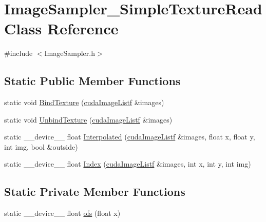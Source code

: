\hypertarget{class_image_sampler___simple_texture_read}{}\section{Image\+Sampler\+\_\+\+Simple\+Texture\+Read Class Reference}
\label{class_image_sampler___simple_texture_read}


{\ttfamily \#include $<$Image\+Sampler.\+h$>$}

\subsection*{Static Public Member Functions}
\begin{DoxyCompactItemize}
\item 
static void \hyperlink{class_image_sampler___simple_texture_read_a448c66522264587999b4829f556da61d}{Bind\+Texture} (\hyperlink{_queued_c_u_d_a_tracker_8h_a84de79f5d4b6e4c8d5622fe712c1bd69}{cuda\+Image\+Listf} \&images)
\item 
static void \hyperlink{class_image_sampler___simple_texture_read_afefcfc9e9b1a443c981adb8e11da5763}{Unbind\+Texture} (\hyperlink{_queued_c_u_d_a_tracker_8h_a84de79f5d4b6e4c8d5622fe712c1bd69}{cuda\+Image\+Listf} \&images)
\item 
static \+\_\+\+\_\+device\+\_\+\+\_\+ float \hyperlink{class_image_sampler___simple_texture_read_a22c0cdc0a5fbd21008e21358bcc09c48}{Interpolated} (\hyperlink{_queued_c_u_d_a_tracker_8h_a84de79f5d4b6e4c8d5622fe712c1bd69}{cuda\+Image\+Listf} \&images, float x, float y, int img, bool \&outside)
\item 
static \+\_\+\+\_\+device\+\_\+\+\_\+ float \hyperlink{class_image_sampler___simple_texture_read_a50a31c29c6e18f167b4e303e8d6a9b75}{Index} (\hyperlink{_queued_c_u_d_a_tracker_8h_a84de79f5d4b6e4c8d5622fe712c1bd69}{cuda\+Image\+Listf} \&images, int x, int y, int img)
\end{DoxyCompactItemize}
\subsection*{Static Private Member Functions}
\begin{DoxyCompactItemize}
\item 
static \+\_\+\+\_\+device\+\_\+\+\_\+ float \hyperlink{class_image_sampler___simple_texture_read_a74800394113e461fcfc92257b5b3df8d}{ofs} (float x)
\end{DoxyCompactItemize}


